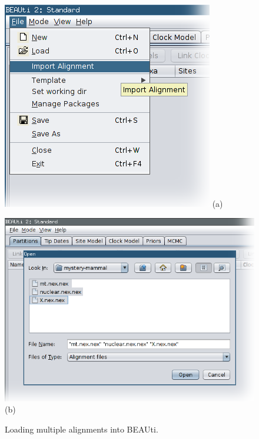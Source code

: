 \documentclass[a4paper,11pt]{article}
\begin{document}
\begin{figure}[h!]
    \centering
    \hspace{-0.5cm}\begin{minipage}[b]{0.4\textwidth}
        \begin{center}
            \includegraphics[width=\textwidth]{figures/import_alignment.png}
            (a)
        \end{center}
    \end{minipage}\hspace{0.5cm}\begin{minipage}[b]{0.6\textwidth}
        \begin{center}
            \includegraphics[width=\textwidth]{figures/import_alignment2.png}
            (b)
        \end{center}
    \end{minipage}
    \caption{Loading multiple alignments into BEAUti.}
\label{fig:importAlignment}
\end{figure}
\end{document}
